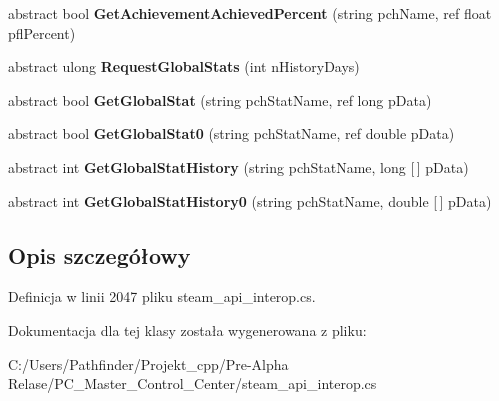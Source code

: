 \begin{DoxyCompactItemize}
\item 
\mbox{\label{class_valve_1_1_steamworks_1_1_i_steam_user_stats_af2c9c36e3d38b2f6c7d399feb6e7148c}} 
abstract bool {\bfseries Get\+Achievement\+Achieved\+Percent} (string pch\+Name, ref float pfl\+Percent)
\item 
\mbox{\label{class_valve_1_1_steamworks_1_1_i_steam_user_stats_a91b3928aab4006b8a242a488544d295a}} 
abstract ulong {\bfseries Request\+Global\+Stats} (int n\+History\+Days)
\item 
\mbox{\label{class_valve_1_1_steamworks_1_1_i_steam_user_stats_a92bf54658104c148284cd754d3491546}} 
abstract bool {\bfseries Get\+Global\+Stat} (string pch\+Stat\+Name, ref long p\+Data)
\item 
\mbox{\label{class_valve_1_1_steamworks_1_1_i_steam_user_stats_a19045556c6d6d16e1ee35a12f6a13644}} 
abstract bool {\bfseries Get\+Global\+Stat0} (string pch\+Stat\+Name, ref double p\+Data)
\item 
\mbox{\label{class_valve_1_1_steamworks_1_1_i_steam_user_stats_af5e1ee4b3cf5a4f39e339156cb6ad9d7}} 
abstract int {\bfseries Get\+Global\+Stat\+History} (string pch\+Stat\+Name, long \mbox{[}$\,$\mbox{]} p\+Data)
\item 
\mbox{\label{class_valve_1_1_steamworks_1_1_i_steam_user_stats_ad676220879caf2339243dd0849e894fd}} 
abstract int {\bfseries Get\+Global\+Stat\+History0} (string pch\+Stat\+Name, double \mbox{[}$\,$\mbox{]} p\+Data)
\end{DoxyCompactItemize}


\subsection{Opis szczegółowy}


Definicja w linii 2047 pliku steam\+\_\+api\+\_\+interop.\+cs.



Dokumentacja dla tej klasy została wygenerowana z pliku\+:\begin{DoxyCompactItemize}
\item 
C\+:/\+Users/\+Pathfinder/\+Projekt\+\_\+cpp/\+Pre-\/\+Alpha Relase/\+P\+C\+\_\+\+Master\+\_\+\+Control\+\_\+\+Center/steam\+\_\+api\+\_\+interop.\+cs\end{DoxyCompactItemize}
